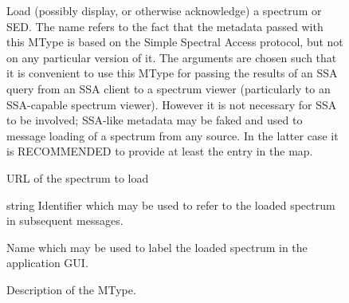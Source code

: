 		\begin{figure}[tbp]
			\centering
			\begin{minipage}{0.9\textwidth}
				\begin{framed}
							{
								Load (possibly display, or otherwise
								acknowledge) a spectrum or SED. The
								name refers to the fact that the
								metadata passed with this MType is
								based on the Simple Spectral Access
								protocol, but not on any particular
								version of it. The arguments are chosen
								such that it is convenient to use this
								MType for passing the results of an SSA
								query from an SSA client to a spectrum
								viewer (particularly to an SSA-capable
								spectrum viewer). However it is not
								necessary for SSA to be involved;
								SSA-like metadata may be faked and used
								to message loading of a spectrum from
								any source. In the latter case it is
								RECOMMENDED to provide at least the
								 entry in the
								 map.
							}
							{
								{URL of the spectrum to load}


								{string}
								{
									Identifier which may be used to
									refer to the loaded spectrum in
									subsequent messages.
								}

								{
									Name which may be used to label the
									loaded spectrum in the application
									GUI.
								}
							}
							{\mtypeparamnone}
				\end{framed}
			\end{minipage}
			
			\caption[ MType
			description]
			{Description of the 
			MType.}
			\label{fig:spectrumLoadSsaGenericMtype}
		\end{figure}
		
